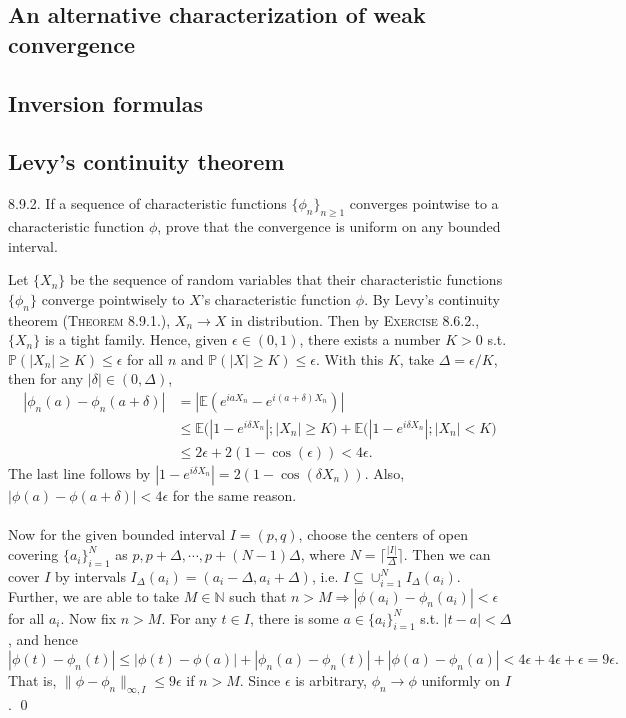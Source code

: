 \subsection{An alternative characterization of weak convergence}
\subsection{Inversion formulas}
\subsection{Levy’s continuity theorem}

\begin{exercise}8.9.2. If a sequence of characteristic functions $\{\phi_n\}_{n\geq1}$ converges pointwise to a characteristic function $\phi$, prove that the convergence is uniform on any bounded interval.
\end{exercise}
\begin{answer} Let $\{X_n\}$ be the sequence of random variables that their characteristic functions $\{\phi_n\}$ converge pointwisely to $X$'s characteristic function $\phi$. By Levy's continuity theorem (\textsc{Theorem 8.9.1.}), $X_n\rightarrow X$ in distribution. Then by \textsc{Exercise 8.6.2.}, $\{X_n\}$ is a tight family. Hence, given $\epsilon\in(0,1)$, there exists a number $K>0$ s.t. $\mathbb{P}(|X_n|\geq K)\leq\epsilon$ for all $n$ and $\mathbb{P}(|X|\geq K)\leq\epsilon$. With this $K$, take $\Delta=\epsilon/K$, then for any $|\delta|\in(0,\Delta)$,
\begin{equation*}
\begin{aligned}
    |\phi_n(a)-\phi_n(a+\delta)|&=|\mathbb{E}(e^{iaX_n}-e^{i(a+\delta)X_n})|\\&
    \leq\mathbb{E}\big(|1-e^{i\delta X_n}|;|X_n|\geq K\big)+\mathbb{E}\big(|1-e^{i\delta X_n}|;|X_n|<K\big)\\&
    \leq 2\epsilon+2(1-\cos(\epsilon))<4\epsilon.
\end{aligned}
\end{equation*}
The last line follows by $|1-e^{i\delta X_n}|=2(1-\cos(\delta X_n))$. Also, $|\phi(a)-\phi(a+\delta)|<4\epsilon$ for the same reason.\\ \\
Now for the given bounded interval $I=(p,q)$, choose the centers of open covering $\{a_i\}_{i=1}^N$ as $p,p+\Delta,\cdots,p+(N-1)\Delta$, where $N=\lceil\frac{|I|}{\Delta}\rceil$. Then we can cover $I$ by intervals $I_{\Delta}(a_i)=(a_i-\Delta, a_i+\Delta)$, i.e. $I\subseteq\cup_{i=1}^NI_{\Delta}(a_i)$. Further, we are able to take $M\in\mathbb{N}$ such that $n>M\Rightarrow|\phi(a_i)-\phi_n(a_i)|<\epsilon$ for all $a_i$. Now fix $n>M$. For any $t\in I$, there is some $a\in\{a_i\}_{i=1}^N$ s.t. $|t-a|<\Delta$, and hence
\begin{equation*}
    |\phi(t)-\phi_n(t)|\leq|\phi(t)-\phi(a)|+|\phi_n(a)-\phi_n(t)|+|\phi(a)-\phi_n(a)|<4\epsilon+4\epsilon+\epsilon=9\epsilon.
\end{equation*}
That is, $\|\phi-\phi_n\|_{\infty,I}\leq 9\epsilon$ if $n>M$. Since $\epsilon$ is arbitrary, $\phi_n\rightarrow\phi$ uniformly on $I$.
\qed\qquad
\end{answer}

